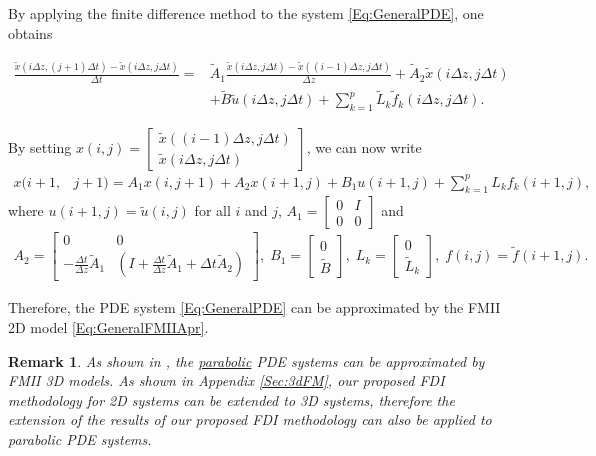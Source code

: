 \documentclass[journal,12pt,draftcls,onecolumn]{IEEEtran}
\newcommand{\bbm}{\begin{bmatrix}}
\newcommand{\ebm}{\end{bmatrix}}
\newcommand{\bs}{\begin{small}}
\newcommand{\es}{\end{small}}
\def\QEDclosed{\hfill\IEEEQEDclosed}
\renewcommand{\qed}{\QEDclosed}
\newtheorem{remark}{Remark}
\begin{document}
By applying the finite difference method to the system \eqref{Eq:GeneralPDE}, one obtains
\bs
\begin{equation}\label{Eq:GeneralPDEApr}
\begin{split}
\frac{\tilde{x}(i\Delta z, (j+1)\Delta t)-\tilde{x}(i\Delta z, j\Delta t)}{\Delta t} = &\tilde{A}_1 \frac{\tilde{x}(i\Delta z, j\Delta t)-\tilde{x}((i-1)\Delta z, j\Delta t)}{\Delta z} + \tilde{A}_2 \tilde{x}(i\Delta z, j\Delta t) \\&+ \tilde{B} \tilde{u}(i\Delta z, j\Delta t)+\sum_{k=1}^p \tilde{L}_k\tilde{f}_k(i\Delta z, j\Delta t).
\end{split}
\end{equation}
\es
By setting $x(i,j)= \bbm\tilde{x}((i-1)\Delta z,j\Delta t) \\ \tilde{x}(i\Delta z,j\Delta t)\ebm$, we can now write
\begin{equation}\label{Eq:GeneralFMIIApr}
\begin{split}
x(i+1,&j+1) =  A_1x(i,j+1) + A_2x(i+1,j) + B_1 u(i+1,j) +\sum_{k=1}^p {L}_{k}{f}_k(i+1,j),
\end{split}
\end{equation}
where $u(i+1,j)=\tilde{u}(i,j)$ for all $i$ and $j$, $A_1 = \bbm 0 &I\\ 0 &0\ebm$ and
\begin{equation*}
\begin{split}
A_2= \bbm 0 &0\\ -\frac{\Delta t}{\Delta z} \tilde{A}_1  &(I+\frac{\Delta t}{\Delta z} \tilde{A}_1 + \Delta t \tilde{A}_2)\ebm,\;
B_1 = \bbm 0\\ \tilde{B}\ebm, \; L_k=\bbm 0\\ \tilde{L}_k\ebm, \; f(i,j)=\tilde{f}(i+1,j).
\end{split}
\end{equation*}

Therefore, the PDE system \eqref{Eq:GeneralPDE} can be approximated by the FMII 2D model \eqref{Eq:GeneralFMIIApr}.
\begin{remark}
	As shown in \cite{Parabolic3D}, the \underline{parabolic} PDE systems can be approximated by FMII 3D models. As shown in Appendix \ref{Sec:3dFM}, our proposed FDI methodology for 2D systems can be extended to 3D systems, therefore the extension of the results of our proposed FDI methodology can also be applied to parabolic PDE systems.\qed
\end{remark}
\end{document}
